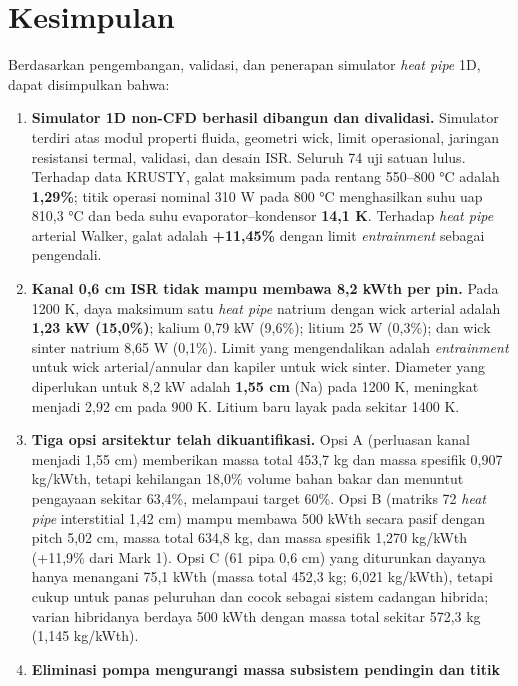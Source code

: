 \documentclass[
  indonesian,
  12pt,
  a4paper,
]{report}
\begin{document}
\section{Kesimpulan}\label{kesimpulan}

Berdasarkan pengembangan, validasi, dan penerapan simulator \emph{heat
pipe} 1D, dapat disimpulkan bahwa:

\begin{enumerate}
\def\labelenumi{\arabic{enumi}.}
\item
  \textbf{Simulator 1D non-CFD berhasil dibangun dan divalidasi.}
  Simulator terdiri atas modul properti fluida, geometri wick, limit
  operasional, jaringan resistansi termal, validasi, dan desain ISR.
  Seluruh 74 uji satuan lulus. Terhadap data KRUSTY, galat maksimum pada
  rentang 550--800 °C adalah \textbf{1,29\%}; titik operasi nominal 310
  W pada 800 °C menghasilkan suhu uap 810,3 °C dan beda suhu
  evaporator--kondensor \textbf{14,1 K}. Terhadap \emph{heat pipe}
  arterial Walker, galat adalah \textbf{+11,45\%} dengan limit
  \emph{entrainment} sebagai pengendali.
\item
  \textbf{Kanal 0,6 cm ISR tidak mampu membawa 8,2 kWth per pin.} Pada
  1200 K, daya maksimum satu \emph{heat pipe} natrium dengan wick
  arterial adalah \textbf{1,23 kW (15,0\%)}; kalium 0,79 kW (9,6\%);
  litium 25 W (0,3\%); dan wick sinter natrium 8,65 W (0,1\%). Limit
  yang mengendalikan adalah \emph{entrainment} untuk wick
  arterial/annular dan kapiler untuk wick sinter. Diameter yang
  diperlukan untuk 8,2 kW adalah \textbf{1,55 cm} (Na) pada 1200 K,
  meningkat menjadi 2,92 cm pada 900 K. Litium baru layak pada sekitar
  1400 K.
\item
  \textbf{Tiga opsi arsitektur telah dikuantifikasi.} Opsi A (perluasan
  kanal menjadi 1,55 cm) memberikan massa total 453,7 kg dan massa
  spesifik 0,907 kg/kWth, tetapi kehilangan 18,0\% volume bahan bakar
  dan menuntut pengayaan sekitar 63,4\%, melampaui target 60\%. Opsi B
  (matriks 72 \emph{heat pipe} interstitial 1,42 cm) mampu membawa 500
  kWth secara pasif dengan pitch 5,02 cm, massa total 634,8 kg, dan
  massa spesifik 1,270 kg/kWth (+11,9\% dari Mark 1). Opsi C (61 pipa
  0,6 cm) yang diturunkan dayanya hanya menangani 75,1 kWth (massa total
  452,3 kg; 6,021 kg/kWth), tetapi cukup untuk panas peluruhan dan cocok
  sebagai sistem cadangan hibrida; varian hibridanya berdaya 500 kWth
  dengan massa total sekitar 572,3 kg (1,145 kg/kWth).
\item
  \textbf{Eliminasi pompa mengurangi massa subsistem pendingin dan titik
}
\end{enumerate}
\end{document}
